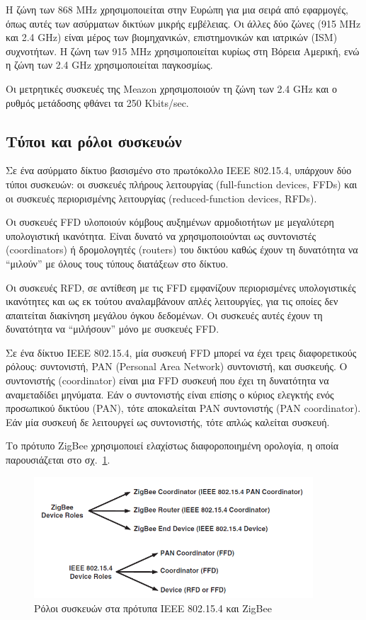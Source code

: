 \documentclass[12pt, a4paper, oneside]{report}
\begin{document}
Η ζώνη των 868 MHz χρησιμοποιείται στην Ευρώπη για μια σειρά από εφαρμογές, όπως αυτές των ασύρματων δικτύων μικρής εμβέλειας. Οι άλλες δύο ζώνες (915 MHz και 2.4 GHz) είναι μέρος των βιομηχανικών, επιστημονικών και ιατρικών (ISM) συχνοτήτων. Η ζώνη των 915 MHz χρησιμοποιείται κυρίως στη Βόρεια Αμερική, ενώ η ζώνη των 2.4 GHz χρησιμοποιείται παγκοσμίως.

Οι μετρητικές συσκευές της Meazon χρησιμοποιούν τη ζώνη των 2.4 GHz και ο ρυθμός μετάδοσης φθάνει τα 250 Kbits/sec.

\subsection{Τύποι και ρόλοι συσκευών}

Σε ένα ασύρματο δίκτυο βασισμένο στο πρωτόκολλο IEEE 802.15.4, υπάρχουν δύο τύποι συσκευών: οι συσκευές πλήρους λειτουργίας (full-function devices, FFDs) και οι συσκευές περιορισμένης λειτουργίας (re\-duced-function devices, RFDs). 

Οι συσκευές FFD υλοποιούν κόμβους αυξημένων αρμοδιοτήτων με μεγαλύτερη υπολογιστική ικανότητα. Είναι δυνατό να χρησιμοποιούνται ως συντονιστές (coordinators) ή δρομολογητές (routers) του δικτύου καθώς έχουν τη δυνατότητα να ``μιλούν'' με όλους τους τύπους διατάξεων στο δίκτυο.

Οι συσκευές RFD, σε αντίθεση με τις FFD εμφανίζουν περιορισμένες υπολογιστικές ικανότητες και ως εκ τούτου αναλαμβάνουν απλές λειτουργίες, για τις οποίες δεν απαιτείται διακίνηση μεγάλου όγκου δεδομένων. Οι συσκευές αυτές έχουν τη δυνατότητα να ``μιλήσουν'' μόνο με συσκευές FFD.

Σε ένα δίκτυο IEEE 802.15.4, μία συσκευή FFD μπορεί να έχει τρεις διαφορετικούς ρόλους: συντονιστή, PAN (Personal Area Network) συντονιστή, και συσκευής. Ο συντονιστής (coordinator) είναι μια FFD συσκευή που έχει τη δυνατότητα να αναμεταδίδει μηνύματα. Εάν ο συντονιστής είναι επίσης ο κύριος ελεγκτής ενός προσωπικού δικτύου (PAN), τότε αποκαλείται PAN συντονιστής (PAN coordinator). Εάν μία συσκευή δε λειτουργεί ως συντονιστής, τότε απλώς καλείται συσκευή.

Το πρότυπο ZigBee χρησιμοποιεί ελαχίστως διαφοροποιημένη ορολογία, η οποία παρουσιάζεται στο σχ.~\ref{eik15}. 
\begin{figure}[!ht]
\centering
\includegraphics[width=0.93\textwidth]{eikona_15}
\caption[Ρόλοι συσκευών στα IEEE 802.15.4 και ZigBee]{Ρόλοι συσκευών στα πρότυπα IEEE 802.15.4 και ZigBee\cite{zigarrows}}\label{eik15}
\end{figure}
\end{document}

